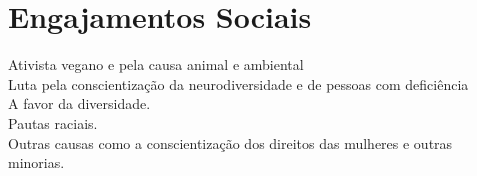 \section{Engajamentos Sociais}
    \begin{itemize}[leftmargin=0.15in, label={}]
	\small{\item{
		\textbf{}{Ativista vegano e pela causa animal e ambiental} \\
		\textbf{}{Luta pela conscientização da neurodiversidade e de pessoas com deficiência } \\
		\textbf{}{A favor da diversidade.} \\
  		\textbf{}{Pautas raciais.} \\
        \textbf{}{Outras causas como a conscientização dos direitos das mulheres e outras minorias.}
	}}
    \end{itemize}